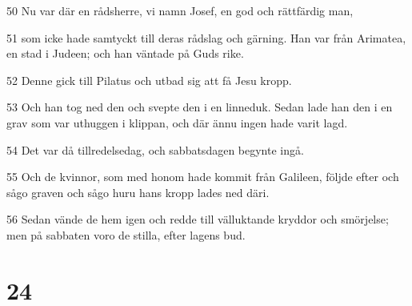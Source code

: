 \par 50 Nu var där en rådsherre, vi namn Josef, en god och rättfärdig man,
\par 51 som icke hade samtyckt till deras rådslag och gärning. Han var från Arimatea, en stad i Judeen; och han väntade på Guds rike.
\par 52 Denne gick till Pilatus och utbad sig att få Jesu kropp.
\par 53 Och han tog ned den och svepte den i en linneduk. Sedan lade han den i en grav som var uthuggen i klippan, och där ännu ingen hade varit lagd.
\par 54 Det var då tillredelsedag, och sabbatsdagen begynte ingå.
\par 55 Och de kvinnor, som med honom hade kommit från Galileen, följde efter och sågo graven och sågo huru hans kropp lades ned däri.
\par 56 Sedan vände de hem igen och redde till välluktande kryddor och smörjelse; men på sabbaten voro de stilla, efter lagens bud.

\chapter{24}

